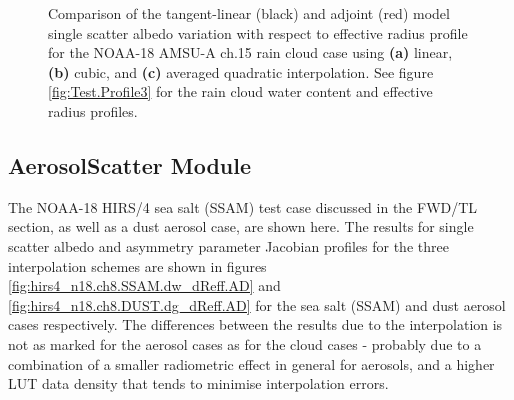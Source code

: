 \begin{figure}[htp]
\begin{tabular}{c c c}
  \end{tabular}
  \caption{Comparison of the tangent-linear (black) and adjoint (red) model single scatter albedo variation with respect to effective radius profile for the NOAA-18 AMSU-A ch.15 rain cloud case using \textbf{(a)} linear, \textbf{(b)} cubic, and \textbf{(c)} averaged quadratic interpolation. See figure \ref{fig:Test.Profile3} for the rain cloud water content and effective radius profiles.}
  \label{fig:amsua_n18.ch15.RAIN.dw_dReff.AD}
\end{figure}

 
\subsection{AerosolScatter Module}
The NOAA-18 HIRS/4 sea salt (SSAM) test case discussed in the FWD/TL section, as well as a dust aerosol case, are shown here. The results for single scatter albedo and asymmetry parameter Jacobian profiles for the three interpolation schemes are shown in figures \ref{fig:hirs4_n18.ch8.SSAM.dw_dReff.AD} and \ref{fig:hirs4_n18.ch8.DUST.dg_dReff.AD} for the sea salt (SSAM) and dust aerosol cases respectively. The differences between the results due to the interpolation is not as marked for the aerosol cases as for the cloud cases - probably due to a combination of a smaller radiometric effect in general for aerosols, and a higher LUT data density that tends to minimise interpolation errors.

